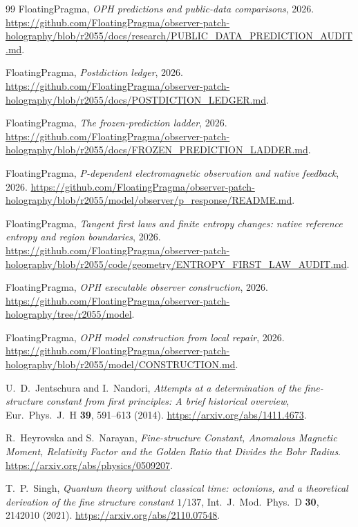 \documentclass[11pt]{article}
\theoremstyle{remark}
\begin{document}
\begin{thebibliography}{99}
FloatingPragma,
\emph{OPH predictions and public-data comparisons}, 2026.
\url{https://github.com/FloatingPragma/observer-patch-holography/blob/r2055/docs/research/PUBLIC_DATA_PREDICTION_AUDIT.md}.

FloatingPragma,
\emph{Postdiction ledger}, 2026.
\url{https://github.com/FloatingPragma/observer-patch-holography/blob/r2055/docs/POSTDICTION_LEDGER.md}.

FloatingPragma,
\emph{The frozen-prediction ladder}, 2026.
\url{https://github.com/FloatingPragma/observer-patch-holography/blob/r2055/docs/FROZEN_PREDICTION_LADDER.md}.

FloatingPragma,
\emph{P-dependent electromagnetic observation and native feedback}, 2026.
\url{https://github.com/FloatingPragma/observer-patch-holography/blob/r2055/model/observer/p_response/README.md}.

FloatingPragma,
\emph{Tangent first laws and finite entropy changes: native reference entropy and region boundaries}, 2026.
\url{https://github.com/FloatingPragma/observer-patch-holography/blob/r2055/code/geometry/ENTROPY_FIRST_LAW_AUDIT.md}.

FloatingPragma,
\emph{OPH executable observer construction}, 2026.
\url{https://github.com/FloatingPragma/observer-patch-holography/tree/r2055/model}.

FloatingPragma,
\emph{OPH model construction from local repair}, 2026.
\url{https://github.com/FloatingPragma/observer-patch-holography/blob/r2055/model/CONSTRUCTION.md}.

U.\ D.\ Jentschura and I.\ Nandori,
\emph{Attempts at a determination of the fine-structure constant from first principles: A brief historical overview},
Eur.\ Phys.\ J.\ H \textbf{39}, 591--613 (2014).
\url{https://arxiv.org/abs/1411.4673}.

R.\ Heyrovska and S.\ Narayan,
\emph{Fine-structure Constant, Anomalous Magnetic Moment, Relativity Factor and the Golden Ratio that Divides the Bohr Radius}.
\url{https://arxiv.org/abs/physics/0509207}.

T.\ P.\ Singh,
\emph{Quantum theory without classical time: octonions, and a theoretical derivation of the fine structure constant \(1/137\)},
Int.\ J.\ Mod.\ Phys.\ D \textbf{30}, 2142010 (2021).
\url{https://arxiv.org/abs/2110.07548}.


\end{thebibliography}
\end{document}
